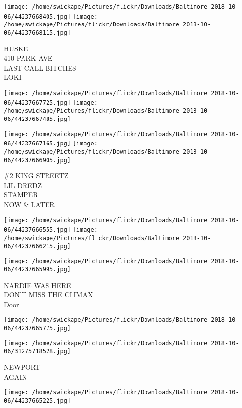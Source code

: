 \documentclass[10pt,letterpaper]{article}
\begin{document}
\texttt{[image: /home/swickape/Pictures/flickr/Downloads/Baltimore 2018-10-06/44237668405.jpg]}
\texttt{[image: /home/swickape/Pictures/flickr/Downloads/Baltimore 2018-10-06/44237668115.jpg]}

HUSKE\\
410 PARK AVE\\
LAST CALL BITCHES\\
LOKI\\
\pagebreak

\texttt{[image: /home/swickape/Pictures/flickr/Downloads/Baltimore 2018-10-06/44237667725.jpg]}
\texttt{[image: /home/swickape/Pictures/flickr/Downloads/Baltimore 2018-10-06/44237667485.jpg]}

\texttt{[image: /home/swickape/Pictures/flickr/Downloads/Baltimore 2018-10-06/44237667165.jpg]}
\texttt{[image: /home/swickape/Pictures/flickr/Downloads/Baltimore 2018-10-06/44237666905.jpg]}

\#2 KING STREETZ\\
LIL DREDZ\\
STAMPER\\
NOW \& LATER\\
\pagebreak

\texttt{[image: /home/swickape/Pictures/flickr/Downloads/Baltimore 2018-10-06/44237666555.jpg]}
\texttt{[image: /home/swickape/Pictures/flickr/Downloads/Baltimore 2018-10-06/44237666215.jpg]}

\texttt{[image: /home/swickape/Pictures/flickr/Downloads/Baltimore 2018-10-06/44237665995.jpg]}

NARDIE WAS HERE\\
DON'T MISS THE CLIMAX\\
Door\\
\pagebreak

\texttt{[image: /home/swickape/Pictures/flickr/Downloads/Baltimore 2018-10-06/44237665775.jpg]}

\vspace{0.25in}
\texttt{[image: /home/swickape/Pictures/flickr/Downloads/Baltimore 2018-10-06/31275718528.jpg]}

NEWPORT\\
AGAIN\\
\pagebreak

\texttt{[image: /home/swickape/Pictures/flickr/Downloads/Baltimore 2018-10-06/44237665225.jpg]}
\end{document}
